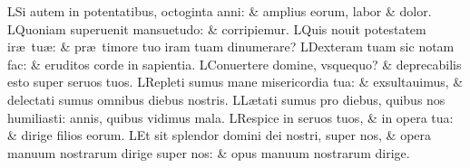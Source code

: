 \documentclass[a5paper,10pt]{book}
\def\ae{æ}
\begin{document}
\begin{multicols*}{2}
\newline \color{red} L\color{black}Si autem in potentatibus, octoginta anni: \& amplius eorum, labor \& dolor.
\newline \color{red} L\color{black}Quoniam superuenit mansuetudo: \& corripiemur.
\newline \color{red} L\color{black}Quis nouit potestatem ir\ae \ tu\ae : \& pr\ae \ timore tuo iram tuam dinumerare?
\newline \color{red} L\color{black}Dexteram tuam sic notam fac: \& eruditos corde in sapientia.
\newline \color{red} L\color{black}Conuertere domine, vsquequo? \& deprecabilis esto super seruos tuos.
\newline \color{red} L\color{black}Repleti sumus mane misericordia tua: \& exsultauimus, \& delectati sumus omnibus diebus nostris.
\newline \color{red} L\color{black}L\ae tati sumus pro diebus, quibus nos humiliasti: annis, quibus vidimus mala.
\newline \color{red} L\color{black}Respice in seruos tuos, \& in opera tua: \& dirige filios eorum.
\newline \color{red} L\color{black}Et sit splendor domini dei nostri, super nos, \& opera manuum nostrarum dirige super nos: \& opus manuum nostrarum dirige.

\end{multicols*}
\end{document}

